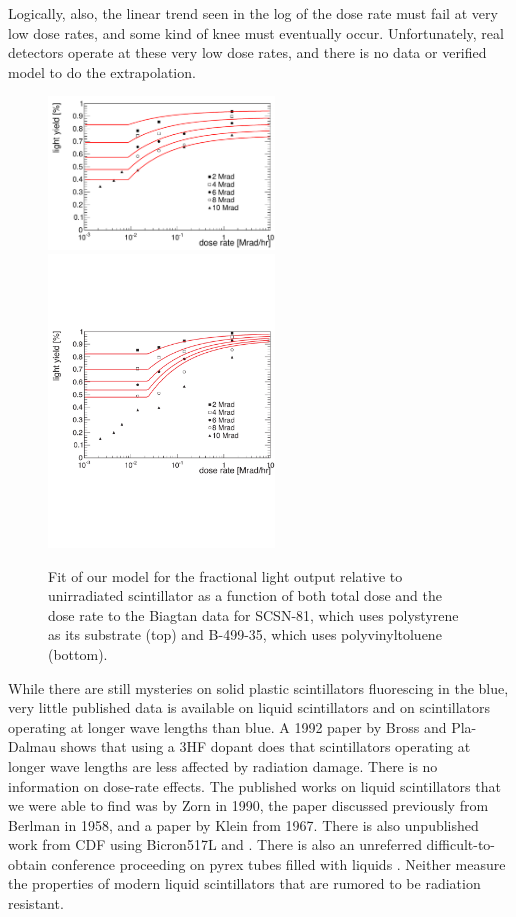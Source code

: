 Logically, also,
the linear trend seen  in the log of the dose rate must fail at 
very low dose rates, and some kind of knee must eventually occur.  
Unfortunately, real detectors operate at these very low dose rates,
and there is no data or verified model to do the extrapolation.



\begin{figure}[!htbp]
\centering
    {\includegraphics[width=6cm]{fitWick8s.pdf}}
    {\includegraphics[width=6cm]{fitWick10bll.pdf}}
\caption{
Fit of our model for the fractional light output relative to
unirradiated scintillator as a function of both total dose
and the dose rate
to the Biagtan data \cite{Biagtan1996125}
for SCSN-81, which uses polystyrene as its substrate (top) and 
B-499-35, which uses polyvinyltoluene (bottom).
}
\label{fig:kevinfit}
\end{figure}

While there are still mysteries on solid plastic scintillators
fluorescing in the blue, very little
published data is available on liquid scintillators and
on scintillators operating at longer wave lengths than blue.
A 1992 paper by Bross and Pla-Dalmau \cite{173178} shows that using
a 3HF dopant does that scintillators operating at longer
wave lengths are less affected by radiation damage.  
There is no information on dose-rate effects.  
The published works on liquid scintillators that we were able
to find was by Zorn \cite{zornliquid} in 1990, the paper
discussed previously from Berlman in 1958, and a paper
by Klein from 1967\cite{Klein1967399}.  There is also
unpublished work from CDF using Bicron517L\cite{kenichi1} and
\cite{kenichi2}.
There is also an unreferred difficult-to-obtain conference
proceeding on pyrex tubes filled with liquids \cite{fsuliquid}.
Neither measure
the properties of modern liquid scintillators that are rumored
to be radiation resistant.


